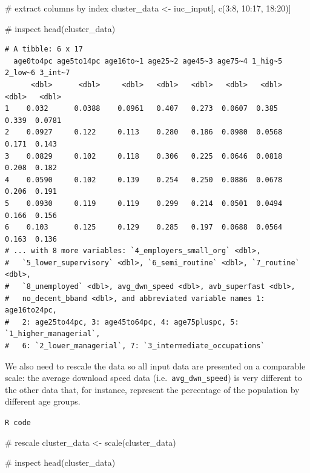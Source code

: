 \documentclass[
  letterpaper,
  DIV=11,
  numbers=noendperiod]{scrreprt}
\newenvironment{Shaded}{\begin{snugshade}}{\end{snugshade}}
\newcommand{\CommentTok}[1]{\textcolor[rgb]{0.37,0.37,0.37}{#1}}
\newcommand{\DecValTok}[1]{\textcolor[rgb]{0.68,0.00,0.00}{#1}}
\newcommand{\FunctionTok}[1]{\textcolor[rgb]{0.28,0.35,0.67}{#1}}
\newcommand{\NormalTok}[1]{\textcolor[rgb]{0.00,0.23,0.31}{#1}}
\newcommand{\OtherTok}[1]{\textcolor[rgb]{0.00,0.23,0.31}{#1}}
\newcommand{\SpecialCharTok}[1]{\textcolor[rgb]{0.37,0.37,0.37}{#1}}
\begin{document}
\begin{Shaded}
\begin{Highlighting}[]
\CommentTok{\# extract columns by index}
\NormalTok{cluster\_data }\OtherTok{\textless{}{-}}\NormalTok{ iuc\_input[, }\FunctionTok{c}\NormalTok{(}\DecValTok{3}\SpecialCharTok{:}\DecValTok{8}\NormalTok{, }\DecValTok{10}\SpecialCharTok{:}\DecValTok{17}\NormalTok{, }\DecValTok{18}\SpecialCharTok{:}\DecValTok{20}\NormalTok{)]}

\CommentTok{\# inspect}
\FunctionTok{head}\NormalTok{(cluster\_data)}
\end{Highlighting}
\end{Shaded}

\begin{verbatim}
# A tibble: 6 x 17
  age0to4pc age5to14pc age16to~1 age25~2 age45~3 age75~4 1_hig~5 2_low~6 3_int~7
      <dbl>      <dbl>     <dbl>   <dbl>   <dbl>   <dbl>   <dbl>   <dbl>   <dbl>
1    0.032      0.0388    0.0961   0.407   0.273  0.0607  0.385    0.339  0.0781
2    0.0927     0.122     0.113    0.280   0.186  0.0980  0.0568   0.171  0.143 
3    0.0829     0.102     0.118    0.306   0.225  0.0646  0.0818   0.208  0.182 
4    0.0590     0.102     0.139    0.254   0.250  0.0886  0.0678   0.206  0.191 
5    0.0930     0.119     0.119    0.299   0.214  0.0501  0.0494   0.166  0.156 
6    0.103      0.125     0.129    0.285   0.197  0.0688  0.0564   0.163  0.136 
# ... with 8 more variables: `4_employers_small_org` <dbl>,
#   `5_lower_supervisory` <dbl>, `6_semi_routine` <dbl>, `7_routine` <dbl>,
#   `8_unemployed` <dbl>, avg_dwn_speed <dbl>, avb_superfast <dbl>,
#   no_decent_bband <dbl>, and abbreviated variable names 1: age16to24pc,
#   2: age25to44pc, 3: age45to64pc, 4: age75pluspc, 5: `1_higher_managerial`,
#   6: `2_lower_managerial`, 7: `3_intermediate_occupations`
\end{verbatim}

We also need to rescale the data so all input data are presented on a
comparable scale: the average download speed data
(i.e.~\texttt{avg\_dwn\_speed}) is very different to the other data
that, for instance, represent the percentage of the population by
different age groups.

\begin{codelisting}

\caption{\texttt{R code}}

\begin{Shaded}
\begin{Highlighting}[]
\CommentTok{\# rescale}
\NormalTok{cluster\_data }\OtherTok{\textless{}{-}} \FunctionTok{scale}\NormalTok{(cluster\_data)}

\CommentTok{\# inspect}
\FunctionTok{head}\NormalTok{(cluster\_data)}
\end{Highlighting}
\end{Shaded}

\end{codelisting}
\end{document}
